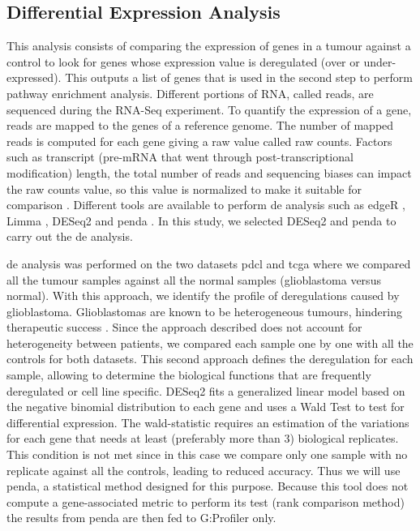 \subsection{Differential Expression Analysis}

This analysis consists of comparing the expression of genes in a tumour against a control to look for genes whose expression value is deregulated (over or under-expressed).
This outputs a list of genes that is used in the second step to perform pathway enrichment analysis.
Different portions of RNA, called reads, are sequenced during the RNA-Seq experiment.
To quantify the expression of a gene, reads are mapped to the genes of a reference genome.
The number of mapped reads is computed for each gene giving a raw value called raw counts.
Factors such as transcript (pre-mRNA that went through post-transcriptional modification) length, the total number of reads and sequencing biases can impact the raw counts value, so this value is normalized to make it suitable for comparison \cite*{Conesa2016}.
Different tools are available to perform \acrshort{de} analysis such as edgeR \cite*{Robinson2010}, Limma \cite*{Ritchie2015}, DESeq2 \cite*{Love2014} and \acrshort{penda} \cite*{Richard2020}.
In this study, we selected DESeq2 \cite*{Love2014} and \acrshort{penda} to carry out the \acrshort{de} analysis.

\acrshort{de} analysis was performed on the two datasets \acrshort{pdcl} and \acrshort{tcga} where we compared all the tumour samples against all the normal samples (glioblastoma versus normal).
With this approach, we identify the profile of deregulations caused by glioblastoma.
Glioblastomas are known to be heterogeneous tumours, hindering therapeutic success \cite*{Neftel2019,Delgado-Lopez2016, Quinones2018}.
Since the approach described does not account for heterogeneity between patients, we compared each sample one by one with all the controls for both datasets.
This second approach defines the deregulation for each sample, allowing to determine the biological functions that are frequently deregulated or cell line specific.
DESeq2 fits a generalized linear model based on the negative binomial distribution to each gene and uses a Wald Test to test for differential expression.
The wald-statistic requires an estimation of the variations for each gene that needs at least (preferably more than 3) biological replicates.
This condition is not met since in this case we compare only one sample with no replicate against all the controls, leading to reduced accuracy.
Thus we will use \acrshort{penda}, a statistical method designed for this purpose.
Because this tool does not compute a gene-associated metric to perform its test (rank comparison method) the results from \acrshort{penda} are then fed to G:Profiler only.

